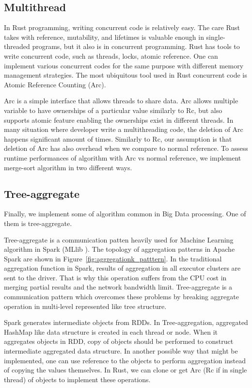\subsection{Multithread}
\label{sec:concenpt_multithreading}
In Rust programming, writing concurrent code is relatively easy. The care Rust takes with reference, mutability, and lifetimes is valuable enough in single-threaded programs, 
but it also is in concurrent programming. Rust has tools to write concurrent code, such as threads, locks, atomic reference. 
One can implement various concurrent codes for the same purpose with different memory management strategies. 
The most ubiquitous tool used in Rust concurrent code is Atomic Reference Counting (Arc). 

Arc is a simple interface that allows threads to share data. Arc allows multiple variable to have ownerships of a particular value similarly to Rc, 
but also supports atomic feature enabling the ownerships exist in different threads. 
In many situation where developer write a multithreading code, the deletion of Arc happens significant amount of times. 
Similarly to Rc, our assumption is that deletion of Arc has also overhead when we compare to normal reference. 
To assess runtime performances of algorithm with Arc vs normal reference, we implement merge-sort algorithm in two different ways. 

\subsection{Tree-aggregate}
\label{sec:concept_treeagg}
Finally, we implement some of algorithm common in Big Data processing. One of them is tree-aggregate.

Tree-aggregate is a communication patten heavily used for Machine Learning algorithm in Spark (MLlib \cite{DBLP:journals/jmlr/MengBYSVLFTAOXX16}). 
The topology of aggregation patterns in Apache Spark are shown in Figure~\ref{fig:aggregationk_patttern}. 
In the traditional aggregation function in Spark, results of aggregation in all executor clusters are sent to the driver. 
That is why this operation suffers from the CPU cost in merging partial results and the network bandwidth limit.
Tree-aggregate is a communication pattern which overcomes these problems by breaking aggregate operation in multi-level represented like tree structure.

Spark generates intermediate objects from RDDs. In Tree-aggregation, aggregated HashMap like data structure is created in each thread or node. 
When it aggregates objects in RDD, copy of objects should be performed to construct intermediate aggregated data structure.
In another possible way that might be implemented, one can use reference to the objects to perform aggregation instead of copying the values themselves.
In Rust, we can clone or get Arc (Rc if in single thread) of objects to implement these operations.


